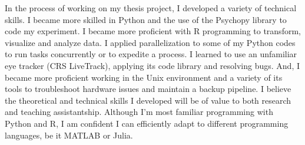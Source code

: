 \documentclass[12pt]{article}
\begin{document}
	In the process of working on my thesis project, I developed a variety of technical skills. I became more skilled in Python and the use of the Psychopy library to code my experiment. I became more proficient with R programming to transform, visualize and analyze data. I applied parallelization to some of my Python codes to run tasks concurrently or to expedite a process. I learned to use an unfamiliar eye tracker (CRS LiveTrack), applying its code library and resolving bugs. And, I became more proficient working in the Unix environment and a variety of its tools to troubleshoot hardware issues and maintain a backup pipeline. I believe the theoretical and technical skills I developed will be of value to both research and teaching assistantship. Although I’m most familiar programming with Python and R, I am confident I can efficiently adapt to different programming languages, be it MATLAB or Julia.
	
	
	
\end{document}
